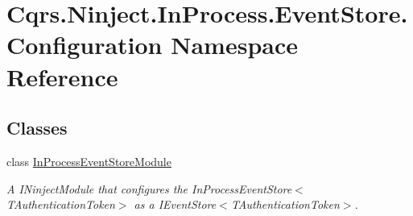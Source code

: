\hypertarget{namespaceCqrs_1_1Ninject_1_1InProcess_1_1EventStore_1_1Configuration}{}\section{Cqrs.\+Ninject.\+In\+Process.\+Event\+Store.\+Configuration Namespace Reference}
\label{namespaceCqrs_1_1Ninject_1_1InProcess_1_1EventStore_1_1Configuration}
\subsection*{Classes}
\begin{DoxyCompactItemize}
\item 
class \hyperlink{classCqrs_1_1Ninject_1_1InProcess_1_1EventStore_1_1Configuration_1_1InProcessEventStoreModule}{In\+Process\+Event\+Store\+Module}
\begin{DoxyCompactList}\small\item\em A I\+Ninject\+Module that configures the In\+Process\+Event\+Store$<$\+T\+Authentication\+Token$>$ as a I\+Event\+Store$<$\+T\+Authentication\+Token$>$. \end{DoxyCompactList}\end{DoxyCompactItemize}
